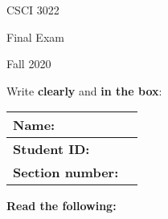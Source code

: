 \documentclass[addpoints]{exam}
\begin{document}
\begin{minipage}[ht!]{.25\textwidth}
CSCI 3022 

Final Exam

Fall 2020
\vfill
\end{minipage}
\begin{minipage}[ht]{.75\textwidth}
	\large
	Write \textbf{clearly} and \textbf{in the box}:
	\centering
	\begin{tabular}{|l c|} 	\hline 
	\rule{0pt}{1cm}
	\textbf{Name:} & \hspace{9cm} \\ \hline 
	\rule{0pt}{1cm}
	\textbf{Student ID:} & \hspace{9cm} \\ \hline 
	\rule{0pt}{1cm} \textbf{Section number:} & \hspace{9cm} \\ \hline 
	\end{tabular}
\end{minipage}%

\vspace{1cm}

{\bf Read the following:}
\vspace{1pc}
\end{document}
